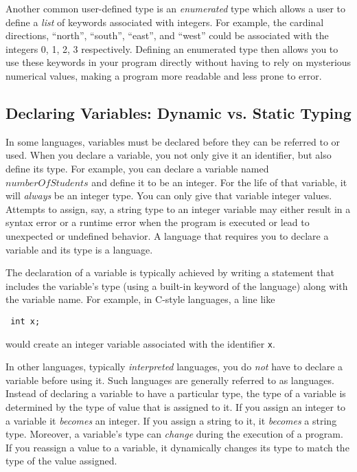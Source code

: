 Another common user-defined type is an  
\emph{enumerated} type which allows
a user to define a \emph{list} of keywords associated with integers.  For example,
the cardinal directions, ``north'', ``south'', ``east'', and ``west'' could be associated
with the integers 0, 1, 2, 3 respectively.   Defining an enumerated type then allows
you to use these keywords in your program directly without having to rely on
mysterious numerical values, making a program more readable and less prone to
error.

\subsection{Declaring Variables: Dynamic vs. Static Typing}

In some languages, variables must be declared before they can be referred to
or used.  When you declare a variable, you not only give it an identifier, but also
define its type.  For example, you can declare a variable named $numberOfStudents$
and define it to be an integer.  For the life of that variable, it will \emph{always}
be an integer type.  You can only give that variable integer values.  Attempts to
assign, say, a string type to an integer variable may either result in a syntax error
or a runtime error when the program is executed or lead to unexpected or 
undefined behavior.  A language that requires you to declare a variable and its
type is a   language.  

The declaration of a variable is typically achieved by writing a statement that
includes the variable's type (using a built-in keyword of the language) along with the
variable name.  For example, in C-style languages, a line like

\texttt{  int x;} 

would create an integer variable associated with the identifier \texttt{x}. 

In other languages, typically \emph{interpreted} languages, you do \emph{not}
have to declare a variable before using it.  Such languages are generally
referred to as   languages.  Instead
of declaring a variable to have a particular type, the type of a variable is 
determined by the type of value that is assigned to it.  If you assign an
integer to a variable it \emph{becomes} an integer.  If you assign a string to it, 
it \emph{becomes} a string type.  Moreover, a variable's type can \emph{change}
during the execution of a program.  If you reassign a value to a variable, it
dynamically changes its type to match the type of the value assigned.

